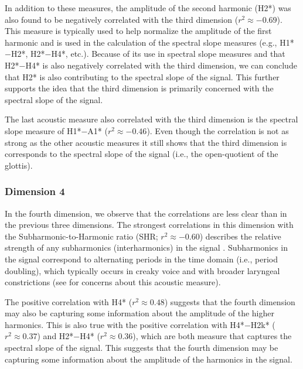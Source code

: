 In addition to these measures, the amplitude of the second harmonic (H2*) was also found to be negatively correlated with the third dimension ($r^{2} \approx -0.69$). This measure is typically used to help normalize the amplitude of the first harmonic and is used in the calculation of the spectral slope measures (e.g., H1*$-$H2*, H2*$-$H4*, etc.). Because of its use in spectral slope measures and that H2*$-$H4* is also negatively correlated with the third dimension, we can conclude that H2* is also contributing to the spectral slope of the signal. This further supports the idea that the third dimension is primarily concerned with the spectral slope of the signal. 

The last acoustic measure also correlated with the third dimension is the spectral slope measure of H1*$-$A1* ($r^{2} \approx -0.46$). Even though the correlation is not as strong as the other acoustic measures it still shows that the third dimension is corresponds to the spectral slope of the signal (i.e., the open-quotient of the glottis).

\subsubsection{Dimension 4} \label{sec:acousticlandscape:dim4}

In the fourth dimension, we observe that the correlations are less clear than in the previous three dimensions. The strongest correlations in this dimension with the Subharmonic-to-Harmonic ratio (SHR; $r^{2} \approx -0.60$) describes the relative strength of any subharmonics (interharmonics) in the signal \citep{sunPitchDeterminationVoice2002}. Subharmonics in the signal correspond to alternating periods in the time domain (i.e., period doubling), which typically occurs in creaky voice and with broader laryngeal constrictions (see \cite{herbstPerformanceEvaluationSubharmonictoHarmonic2021} for concerns about this acoustic measure). 

The positive correlation with H4* ($r^{2} \approx 0.48$) suggests that the fourth dimension may also be capturing some information about the amplitude of the higher harmonics. This is also true with the positive correlation with H4*$-$H2k* ($r^{2} \approx 0.37$) and H2*$-$H4* ($r^{2} \approx 0.36$), which are both measure that captures the spectral slope of the signal. This suggests that the fourth dimension may be capturing some information about the amplitude of the harmonics in the signal. 

